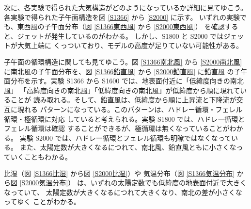 \documentclass[body]{subfiles}
\begin{document}
次に、各実験で得られた大気構造がどのようになっているか詳細に見てゆこう。
各実験で得られた子午面構造を図 \ref{S1366} から \ref{S2000} に示す。
いずれの実験でも、東西風の子午面分布（図 \ref{S1366東西風} から \ref{S2000東西風}）
を確認すると、ジェットが発生しているのがわかる。
しかし、S1800 と S2000 ではジェットが大気上端に
くっついており、モデルの高度が足りていない可能性がある。

子午面の循環構造に関しても見てゆこう。図 \ref{S1366南北風} から \ref{S2000南北風}
に南北風の子午面分布を、図 \ref{S1366鉛直風} から \ref{S2000鉛直風} に鉛直風
の子午面分布を示す。実験 S1366 から S1600 では、地表面付近に「低緯度向きの南北風」
「高緯度向きの南北風」「低緯度向きの南北風」が低緯度から順に現れていることが
読み取れる。そして、鉛直風は、低緯度から順に上昇流と下降流が交互に現れる
パターンになっている。このパターンは、ハドレー循環・フェレル循環・極循環に対応
していると考えられる。実験 S1800 では、ハドレー循環とフェレル循環は確認
することができるが、極循環は無くなっていることがわかる。
実験 S2000 では、ハドレー循環とフェレル循環も明瞭ではなくなっている。
また、太陽定数が大きくなるにつれて、南北風、鉛直風ともに小さくなっていくこともわかる。

比湿（図 \ref{S1366比湿} から図 \ref{S2000比湿}）や
気温分布（図 \ref{S1366気温分布} から図 \ref{S2000気温分布}）
は、いずれの太陽定数でも低緯度の地表面付近で大きくなっていて、
太陽定数が大きくなるにつれて大きくなり、南北の差が小さくなってゆく
ことがわかる。
\end{document}
